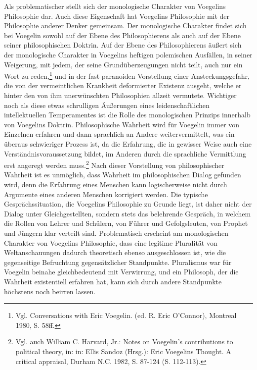 Als problematischer stellt sich der monologische Charakter von Voegelins
Philosophie dar. Auch diese Eigenschaft hat Voegelins Philosophie mit der
Philosophie anderer Denker gemeinsam. Der monologische Charakter findet sich
bei Voegelin sowohl auf der Ebene des Philosophierens als auch auf der Ebene
seiner philosophischen Doktrin. Auf der Ebene des Philosophierens äußert sich
der monologische Charakter in Voegelins heftigen polemischen Ausfällen, in
seiner Weigerung, mit jedem, der seine Grundüberzeugungen nicht teilt, auch
nur ein Wort zu reden,\footnote{Vgl. Conversations with Eric Voegelin. (ed. R.
  Eric O'Connor), Montreal 1980, S. 58ff.} und in der fast paranoiden
Vorstellung einer Ansteckungsgefahr, die von der vermeintlichen Krankheit
deformierter Existenz ausgeht, welche er hinter den von ihm unerwünschten
Philosophien allzeit vermutete. Wichtiger noch als diese etwas schrulligen
Äußerungen eines leidenschaftlichen intellektuellen Temperamentes ist die
Rolle des monologischen Prinzips innerhalb von Voegelins Doktrin.
Philosophische Wahrheit wird für Voegelin immer von Einzelnen erfahren und
dann sprachlich an Andere weitervermittelt, was ein überaus schwieriger Prozess
ist, da die Erfahrung, die in gewisser Weise auch eine
Verständnisvoraussetzung bildet, im Anderen durch die sprachliche Vermittlung
erst angeregt werden muss.\footnote{Vgl. auch William C.  Harvard, Jr.: Notes
  on Voegelin's contributions to political theory, in: in: Ellis Sandoz
  (Hrsg.): Eric Voegelins Thought. A critical appraisal, Durham N.C. 1982,
  S. 87-124 (S. 112-113).} Nach dieser Vorstellung von philosophischer Wahrheit
ist es unmöglich, dass Wahrheit im philosophischen Dialog gefunden wird, denn
die Erfahrung eines Menschen kann logischerweise nicht durch Argumente eines
anderen Menschen korrigiert werden. Die typische Gesprächssituation, die
Voegelins Philosophie zu Grunde liegt, ist daher nicht der Dialog unter
Gleichgestellten, sondern stets das belehrende Gespräch, in welchem die Rollen
von Lehrer und Schülern, von Führer und Gefolgsleuten, von Prophet und Jüngern
klar verteilt sind. Problematisch erscheint am monologischen Charakter von
Voegelins Philosophie, dass eine legitime Pluralität von Weltanschauungen
dadurch theoretisch ebenso ausgeschlossen ist, wie die gegenseitige
Befruchtung gegensätzlicher Standpunkte. Pluralismus war für Voegelin beinahe
gleichbedeutend mit Verwirrung, und ein Philosoph, der die Wahrheit
existentiell erfahren hat, kann sich durch andere Standpunkte höchstens noch
beirren lassen.


